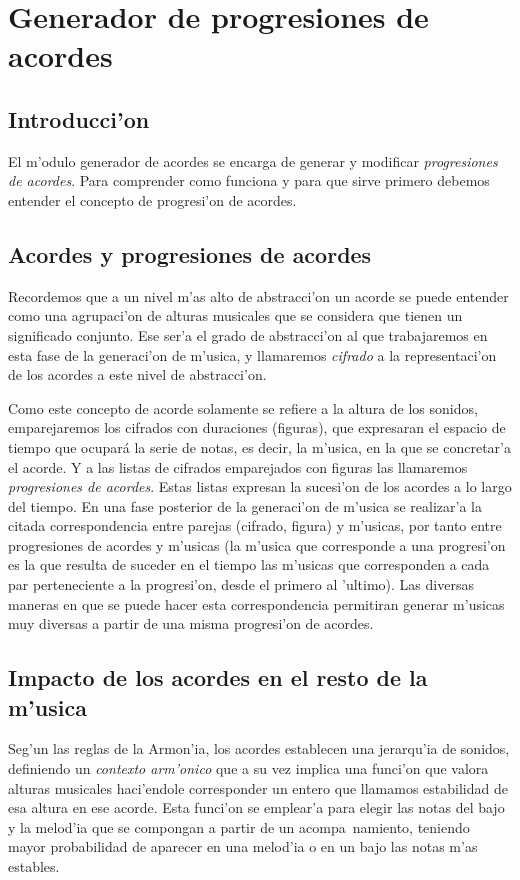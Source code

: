 ﻿\chapter{Generador de progresiones de acordes}
\section{Introducci'on}
El m'odulo generador de acordes se encarga de generar y modificar \emph{progresiones de acordes}. Para comprender como funciona y para que sirve primero debemos entender el concepto de progresi'on de acordes.

\section {Acordes y progresiones de acordes} 

Recordemos que a un nivel m'as alto de abstracci'on un acorde se puede entender como una agrupaci'on de alturas musicales que se considera que tienen un significado conjunto. Ese ser'a el grado de abstracci'on al que trabajaremos en esta fase de la generaci'on de m'usica, y llamaremos \emph{cifrado} a la representaci'on de los acordes a este nivel de abstracci'on. 

Como este concepto de acorde solamente se refiere a la altura de los sonidos, emparejaremos los cifrados con duraciones (figuras), que expresaran el espacio de tiempo que ocupará la serie de notas, es decir, la m'usica, en la que se concretar'a el acorde. Y a las listas de cifrados emparejados con figuras las llamaremos \emph{progresiones de acordes}. Estas listas expresan la sucesi'on de los acordes a lo largo del tiempo. En una fase posterior de la generaci'on de m'usica se realizar'a la citada correspondencia entre parejas (cifrado, figura) y m'usicas, por tanto entre progresiones de acordes y m'usicas (la m'usica que corresponde a una progresi'on es la que resulta de suceder en el tiempo las m'usicas que corresponden a cada par perteneciente a la progresi'on, desde el primero al 'ultimo). Las diversas maneras en que se puede hacer esta correspondencia permitiran generar m'usicas muy diversas a partir de una misma progresi'on de acordes.

\section {Impacto de los acordes en el resto de la m'usica}
Seg'un las reglas de la Armon'ia, los acordes establecen una jerarqu'ia de sonidos, definiendo un \emph{contexto arm'onico} que a su vez implica una funci'on que valora alturas musicales haci'endole corresponder un entero que llamamos estabilidad de esa altura en ese acorde. Esta funci'on se emplear'a para elegir las notas del bajo y la melod'ia que se compongan a partir de un acompa~namiento, teniendo mayor probabilidad de aparecer en una melod'ia o en un bajo las notas m'as estables.

